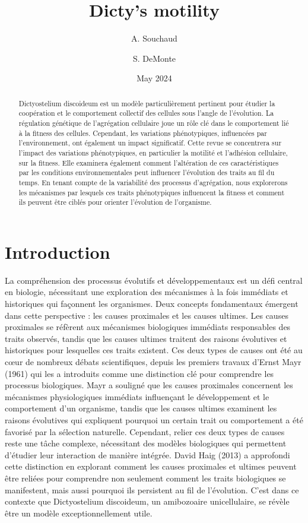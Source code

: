 \documentclass[twocolumn,10pt]{article} %
\title{Dicty's motility}
\author[1]{A. Souchaud}
\author[2]{S. DeMonte}
\affil[1]{\small Institut de Biologie de l'ENS, France}
\affil[2]{\small Allemagne}
\date{May 2024}  %
\begin{document}
\maketitle  %


\begin{abstract}
    Dictyostelium discoideum est un modèle particulièrement pertinent pour étudier la coopération et 
    le comportement collectif des cellules sous l'angle de l'évolution. La régulation génétique de
     l'agrégation cellulaire joue un rôle clé dans le comportement lié à la fitness des cellules.
      Cependant, les variations phénotypiques, influencées par l'environnement, ont également un impact
       significatif. Cette revue se concentrera sur l'impact des variations phénotypiques, en particulier 
       la motilité et l'adhésion cellulaire, sur la fitness. Elle examinera également comment l'altération de ces 
       caractéristiques par les conditions environnementales peut influencer l'évolution des traits au fil du temps. 
       En tenant compte de la variabilité des processus d'agrégation, nous explorerons les mécanismes par lesquels 
       ces traits phénotypiques influencent la fitness et comment ils peuvent être ciblés pour orienter l'évolution 
       de l'organisme.
\end{abstract}

\section{Introduction}
La compréhension des processus évolutifs et développementaux est un défi central en biologie,
nécessitant une exploration des mécanismes à la fois immédiats et historiques qui façonnent les organismes.
Deux concepts fondamentaux émergent dans cette perspective : les causes proximales et les causes ultimes.
Les causes proximales se réfèrent aux mécanismes biologiques immédiats responsables des traits observés,
tandis que les causes ultimes traitent des raisons évolutives et historiques pour lesquelles ces traits existent.
Ces deux types de causes ont été au cœur de nombreux débats scientifiques, depuis les premiers travaux d’Ernst Mayr (1961)
qui les a introduits comme une distinction clé pour comprendre les processus biologiques. Mayr a souligné que les
causes proximales concernent les mécanismes physiologiques immédiats influençant le développement et le comportement 
d'un organisme, tandis que les causes ultimes examinent les raisons évolutives qui expliquent pourquoi un certain trait 
ou comportement a été favorisé par la sélection naturelle.
Cependant, relier ces deux types de causes reste une tâche complexe, nécessitant des modèles biologiques qui permettent 
d'étudier leur interaction de manière intégrée. David Haig (2013) a approfondi cette distinction en explorant comment les 
causes proximales et ultimes peuvent être reliées pour comprendre non seulement comment les traits biologiques se manifestent, 
mais aussi pourquoi ils persistent au fil de l'évolution. C’est dans ce contexte que Dictyostelium discoideum, 
un amibozoaire unicellulaire, se révèle être un modèle exceptionnellement utile.
\end{document}
